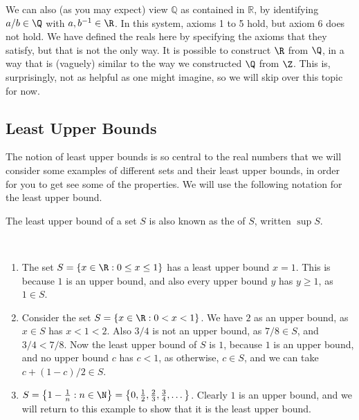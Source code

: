 \documentclass[a4paper]{scrreprt}
\begin{document}
We can also (as you may expect) view $\mathbb{Q}$ as contained in $\mathbb{R}$, by identifying $a/b \in \Q$ with $a, b^{-1} \in \R$. In this system, axioms 1 to 5 hold, but axiom 6 does not hold.
We have defined the reals here by specifying the axioms that they satisfy, but that is not the only way. It is possible to construct $\R$ from $\Q$, in a way that is (vaguely) similar to the way we constructed $\Q$ from $\Z$. This is, surprisingly, not as helpful as one might imagine, so we will skip over this topic for now.

\subsection{Least Upper Bounds}

The notion of least upper bounds is so central to the real numbers that we will consider some examples of different sets and their least upper bounds, in order for you to get see some of the properties. We will use the following notation for the least upper bound.

\begin{definition}[Supremum]
	The least upper bound of a set $S$ is also known as the  of $S$, written $\sup S$.
\end{definition}

\begin{example}~
    \vspace*{-\baselineskip}
\begin{enumerate}
	\item The set $S = \{x \in \R : 0 \leq x \leq 1\}$ has a least upper bound $x = 1$. This is because $1$ is an upper bound, and also every upper bound $y$ has $y \geq 1$, as $1 \in S$.
	\item Consider the set $S = \{ x \in \R : 0 < x < 1\}$. We have $2$ as an upper bound, as $x \in S$ has $x < 1 < 2$. Also $3/4$ is not an upper bound, as $7/8 \in S$, and $3/4 < 7/8$. Now the least upper bound of $S$ is $1$, because $1$ is an upper bound, and no upper bound $c$ has $c < 1$, as otherwise, $c \in S$, and we can take $c + (1 - c)/2 \in S$.
	\item $S = \left\{1 - \frac{1}{n}  : n \in \N \right\} = \left\{0, \frac{1}{2}, \frac{2}{3}, \frac{3}{4}, \dots \right\}$. Clearly $1$ is an upper bound, and we will return to this example to show that it is the least upper bound.
\end{enumerate}
\end{example}
\end{document}
